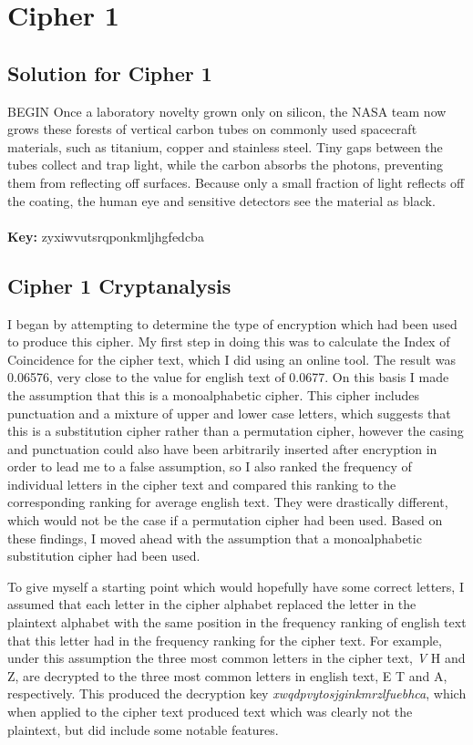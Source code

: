 \section{Cipher 1}
\subsection{Solution for Cipher 1}
BEGIN Once a laboratory novelty grown only on silicon, the NASA team now grows these forests of vertical carbon tubes on commonly used spacecraft materials, such as titanium, copper and stainless steel. Tiny gaps between the tubes collect and trap light, while the carbon absorbs the photons, preventing them from reflecting off surfaces. Because only a small fraction of light reflects off the coating, the human eye and sensitive detectors see the material as black.\\
\\
\textbf{Key:} zyxiwvutsrqponkmljhgfedcba
\subsection{Cipher 1 Cryptanalysis}
I began by attempting to determine the type of encryption which had been used to produce this cipher. My first step in doing this was to calculate the Index of Coincidence for the cipher text, which I did using an online tool. The result was 0.06576, very close to the value for english text of 0.0677. On this basis I made the assumption that this is a monoalphabetic cipher. This cipher includes punctuation and a mixture of upper and lower case letters, which suggests that this is a substitution cipher rather than a permutation cipher, however the casing and punctuation could also have been arbitrarily inserted after encryption in order to lead me to a false assumption, so I also ranked the frequency of individual letters in the cipher text and compared this ranking to the corresponding ranking for average english text. They were drastically different, which would not be the case if a permutation cipher had been used. Based on these findings, I moved ahead with the assumption that a monoalphabetic substitution cipher had been used.

To give myself a starting point which would hopefully have some correct letters, I assumed that each letter in the cipher alphabet replaced the letter in the plaintext alphabet with the same position in the frequency ranking of english text that this letter had in the frequency ranking for the cipher text. For example, under this assumption the three most common letters in the cipher text, \textit{V} H and Z, are decrypted to the three most common letters in english text, E T and A, respectively. This produced the decryption key \textit{xwqdpvytosjginkmrzlfuebhca}, which when applied to the cipher text produced text which was clearly not the plaintext, but did include some notable features.

